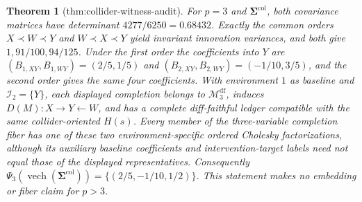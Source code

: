 \documentclass{article}
\newtheorem{theorem}{Theorem}
\begin{document}
\begin{theorem}[thm:collider-witness-audit]\label{thm:collider-witness-audit}
For \(p=3\) and \(\boldsymbol\Sigma^{\mathrm{col}}\), both covariance matrices have determinant \(4277/6250=0.68432\). Exactly the common orders \(X\prec W\prec Y\) and \(W\prec X\prec Y\) yield invariant innovation variances, and both give \(1,91/100,94/125\). Under the first order the coefficients into \(Y\) are \((B_{1,XY},B_{1,WY})=(2/5,1/5)\) and \((B_{2,XY},B_{2,WY})=(-1/10,3/5)\), and the second order gives the same four coefficients. With environment \(1\) as baseline and \(\mathcal I_2=\{Y\}\), each displayed completion belongs to \(\mathcal M_3^{\mathrm{df}}\), induces \(D(M):X\to Y\leftarrow W\), and has a complete diff-faithful ledger compatible with the same collider-oriented \(H(s)\). Every member of the three-variable completion fiber has one of these two environment-specific ordered Cholesky factorizations, although its auxiliary baseline coefficients and intervention-target labels need not equal those of the displayed representatives. Consequently \(\Psi_3(\operatorname{vech}(\boldsymbol\Sigma^{\mathrm{col}}))=\{(2/5,-1/10,1/2)\}\). This statement makes no embedding or fiber claim for \(p>3\).
\end{theorem}
\end{document}
